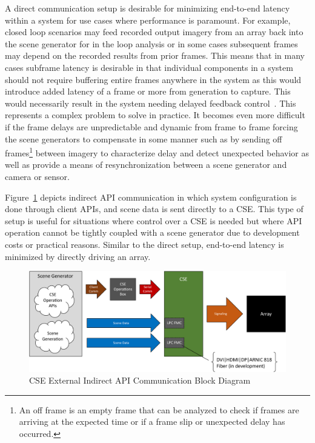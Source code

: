         A direct communication setup is desirable for minimizing end-to-end latency within a system for use cases where performance is paramount. For example, closed loop scenarios may feed recorded output imagery from an array back into the scene generator for in the loop analysis or in some cases subsequent frames may depend on the recorded results from prior frames. This means that in many cases subframe latency is desirable in that individual components in a system should not require buffering entire frames anywhere in the system as this would introduce added latency of a frame or more from generation to capture. This would necessarily result in the system needing delayed feedback control~\cite{HuWang2002}. This represents a complex problem to solve in practice. It becomes even more difficult if the frame delays are unpredictable and dynamic from frame to frame forcing the scene generators to compensate in some manner such as by sending off frames\footnote{An off frame is an empty frame that can be analyzed to check if frames are arriving at the expected time or if a frame slip or unexpected delay has occurred.} between imagery to characterize delay and detect unexpected behavior as well as provide a means of resynchronization between a scene generator and camera or sensor.

        Figure~\ref{fig:external_cse_comm_half_indirect} depicts indirect API communication in which system configuration is done through client APIs, and scene data is sent directly to a CSE. This type of setup is useful for situations where control over a CSE is needed but where API operation cannot be tightly coupled with a scene generator due to development costs or practical reasons. Similar to the direct setup, end-to-end latency is minimized by directly driving an array.

        \begin{figure}
            \centering
            \includegraphics[width=1.0\textwidth]{fig/external_cse_comm_half_indirect.pdf}
            \caption{CSE External Indirect API Communication Block Diagram}
            \label{fig:external_cse_comm_half_indirect}
        \end{figure}

